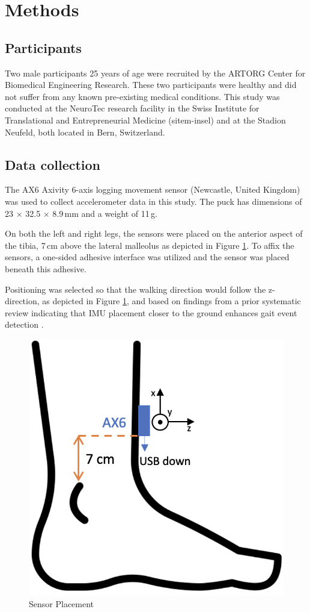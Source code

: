 
\section{Methods}

\subsection{Participants}
Two male participants 25 years of age were recruited by the ARTORG Center for Biomedical Engineering Research. These two participants were healthy and did not suffer from any known pre-existing medical conditions. This study was conducted at the NeuroTec research facility in the Swiss Institute for Translational and Entrepreneurial Medicine (sitem-insel) and at the Stadion Neufeld, both located in Bern, Switzerland.

\subsection{Data collection}
The AX6 Axivity 6-axis logging movement sensor (Newcastle, United Kingdom) was used to collect accelerometer data in this study. The puck has dimensions of 23 $\times$ 32.5 $\times$  8.9\,mm and a weight of 11\,g.

On both the left and right legs, the sensors were placed on the anterior aspect of the tibia, 7\,cm above the lateral malleolus as depicted in Figure \ref{fig:sensorplacement}. To affix the sensors, a one-sided adhesive interface was utilized and the sensor was placed beneath this adhesive. 

Positioning was selected so that the walking direction would follow the z-direction, as depicted in Figure \ref{fig:sensorplacement}, and based on findings from a prior systematic review indicating that IMU placement closer to the ground enhances gait event detection \cite{pacini_panebianco_analysis_2018}.

\begin{figure}[h]
	\centering
	\includegraphics[width=0.6\linewidth]{"Figures/SensorPlacement"}
	\caption{Sensor Placement \cite{noauthor_foot_nodate}}
	\label{fig:sensorplacement}
\end{figure}

